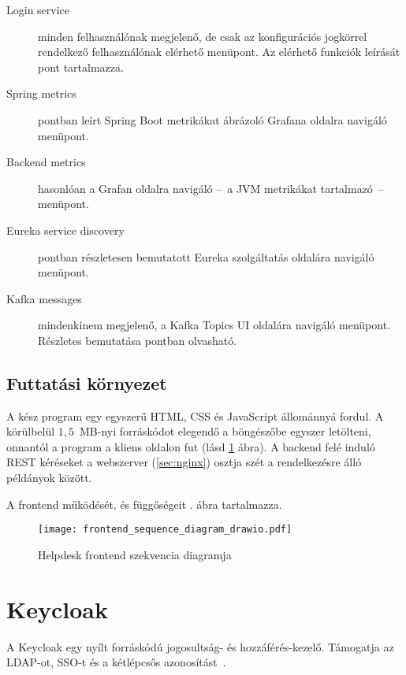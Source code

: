 \begin{description}
	\bigskip
	\item[Login service] minden felhasználónak megjelenő, de csak az konfigurációs jogkörrel rendelkező felhasználónak elérhető menüpont. Az elérhető funkciók leírását  pont tartalmazza.
	
	\item[Spring metrics]  pontban leírt Spring Boot metrikákat ábrázoló Grafana oldalra navigáló menüpont.
	
	\item[Backend metrics] hasonlóan a Grafan oldalra navigáló --~a JVM metrikákat tartalmazó~-- menüpont.

	\item[Eureka service discovery]  pontban részletesen bemutatott Eureka szolgáltatás oldalára navigáló menüpont. 
	
	\item[Kafka messages] mindenkinem megjelenő, a Kafka Topics UI oldalára navigáló menüpont. Részletes bemutatása  pontban olvasható.
	
\end{description}


\subsection{Futtatási környezet}
A kész program egy egyszerű HTML, CSS és JavaScript állománnyá fordul. A körülbelül $1,5$~MB-nyi forráskódot elegendő a böngészőbe egyszer letölteni, onnantól a program a kliens oldalon fut (lásd \ref{fig:frontend_sequence_diagram} ábra). A backend felé induló REST kéréseket a webszerver (\ref{sec:nginx}) osztja szét a rendelkezésre álló példányok között.

A frontend működését, és függőségeit . ábra tartalmazza.

\begin{figure}[hbp] 
	\centering
	\texttt{[image: frontend\_sequence\_diagram\_drawio.pdf]}
	\caption{Helpdesk frontend szekvencia diagramja}
	\label{fig:frontend_sequence_diagram}
\end{figure}

\pagebreak
\section{Keycloak}\label{sec:keycloak}
A Keycloak egy nyílt forráskódú jogosultság- és hozzáférés-kezelő. Támogatja az LDAP-ot, SSO-t és a kétlépcsős azonosítást~\cite{Keycloak_website}. 

